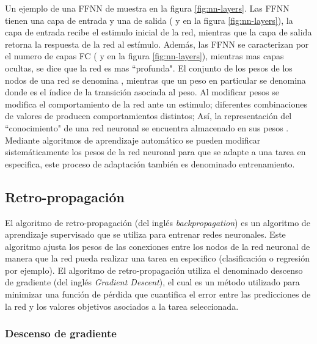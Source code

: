Un ejemplo de una FFNN de muestra en la figura \ref{fig:nn-layers}. Las FFNN tienen una capa de entrada y una de salida ( y  en la figura \ref{fig:nn-layers}), la capa de entrada recibe el estimulo inicial de la red, mientras que la capa de salida retorna la respuesta de la red al estímulo. Además, las FFNN se caracterizan por el numero de capas FC ( y  en la figura \ref{fig:nn-layers}), mientras mas capas ocultas, se dice que la red es mas ``profunda". El conjunto de los pesos de los nodos de una red se denomina \jim{\theta}, mientras que un peso en particular se denomina  donde  es el índice de la transición asociada al peso. Al modificar pesos \jim{\theta} se modifica el comportamiento de la red ante un estimulo; diferentes combinaciones de valores de \jim{\theta} producen comportamientos distintos; Así, la representación del ``conocimiento" de una red neuronal se encuentra almacenado en sus pesos \jim{\theta}. Mediante algoritmos de aprendizaje automático se pueden modificar sistemáticamente los pesos de la red neuronal para que se adapte a una tarea en especifica, este proceso de adaptación \cite{Gurney1997} también es denominado entrenamiento.

\subsection{Retro-propagación}

El algoritmo de retro-propagación (del inglés \textit{backpropagation}) es un algoritmo de aprendizaje supervisado que se utiliza para entrenar redes neuronales. Este algoritmo ajusta los pesos de las conexiones entre los nodos de la red neuronal de manera que la red pueda realizar una tarea en especifico (clasificación o regresión por ejemplo). El algoritmo de retro-propagación utiliza el denominado descenso de gradiente (del inglés \textit{Gradient Descent}), el cual es un método utilizado para minimizar una función de pérdida que cuantifica el error entre las predicciones de la red y los valores objetivos asociados a la tarea seleccionada.

\subsubsection{Descenso de gradiente}

